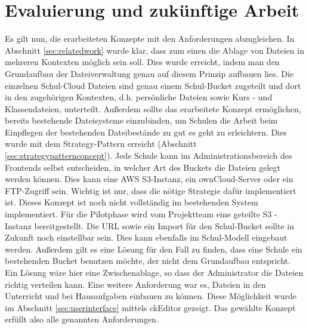 \section{Evaluierung und zukünftige Arbeit}
\label{sec:evaluation}

Es gilt nun, die erarbeiteten Konzepte mit den Anforderungen abzugleichen. In Abschnitt \ref{sec:relatedwork} wurde klar, dass zum einen die Ablage von Dateien in mehreren Kontexten möglich sein soll. Dies wurde erreicht, indem man den Grundaufbau der Dateiverwaltung genau auf diesem Prinzip aufbauen lies. Die einzelnen Schul-Cloud Dateien sind genau einem Schul-Bucket zugeteilt und dort in den zugehörigen Kontexten, d.h. persönliche Dateien sowie Kurs - und Klassendateien, unterteilt. Außerdem sollte das erarbeitete Konzept ermöglichen, bereits bestehende Dateisysteme einzubinden, um Schulen die Arbeit beim Einpflegen der bestehenden Dateibestände zu gut es geht zu erleichtern. Dies wurde mit dem Strategy-Pattern erreicht (Abschnitt \ref{sec:strategypatternconcept}). Jede Schule kann im Administrationsbereich des Frontends selbst entscheiden, in welcher Art des Buckets die Dateien gelegt werden können. Dies kann eine AWS S3-Instanz, ein ownCloud-Server oder ein FTP-Zugriff sein. Wichtig ist nur, dass die nötige Strategie dafür implementiert ist. Dieses Konzept ist noch nicht vollständig im bestehenden System implementiert. Für die Pilotphase wird vom Projektteam eine geteilte S3 - Instanz bereitgestellt. Die URL sowie ein Import für den Schul-Bucket sollte in Zukunft noch einstellbar sein. Dies kann ebenfalls im Schul-Modell eingebaut werden. Außerdem gilt es eine Lösung für den Fall zu finden, dass eine Schule ein bestehenden Bucket benutzen möchte, der nicht dem Grundaufbau entspricht. Ein Lösung wäre hier eine Zwischenablage, so dass der Administrator die Dateien richtig verteilen kann. Eine weitere Anforderung war es, Dateien in den Unterricht und bei Hausaufgaben einbauen zu können. Diese Möglichkeit wurde im Abschnitt \ref{sec:userinterface} mittels ckEditor gezeigt. Das gewählte Konzept erfüllt also alle genannten Anforderungen.

